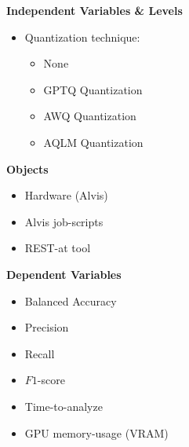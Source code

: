 \documentclass[conference]{IEEEtran}
\begin{document}
\begin{figure}[h]
\begin{center}
    \begin{tcbraster}[raster columns=2, raster column skip=5pt, raster equal height=rows, raster row skip=5pt]
        \begin{roundedBox}
            \centering
            \textbf{Independent Variables \& Levels}
            \begin{itemize}
                \item Quantization technique:
                \begin{itemize}
                    \item None
                    \item GPTQ Quantization
                    \item AWQ Quantization
                    \item AQLM Quantization
                \end{itemize}
            \end{itemize}
        \end{roundedBox}
        \begin{roundedBox}
            \centering
            \textbf{Objects}
            \begin{itemize}
                \item Hardware (Alvis)
                \item Alvis job-scripts
                \item REST-at tool
            \end{itemize}
        \end{roundedBox}
        \begin{roundedBox}
            \centering
            \textbf{Dependent Variables}
            \begin{itemize}
                \item Balanced Accuracy
                \item Precision
                \item Recall
                \item $F1$-score
                \item Time-to-analyze
                \item GPU memory-usage (VRAM)
            \end{itemize}
        \end{roundedBox}
        \begin{roundedBox}

\end{roundedBox}
\end{tcbraster}
\end{center}
\end{figure}
\end{document}
